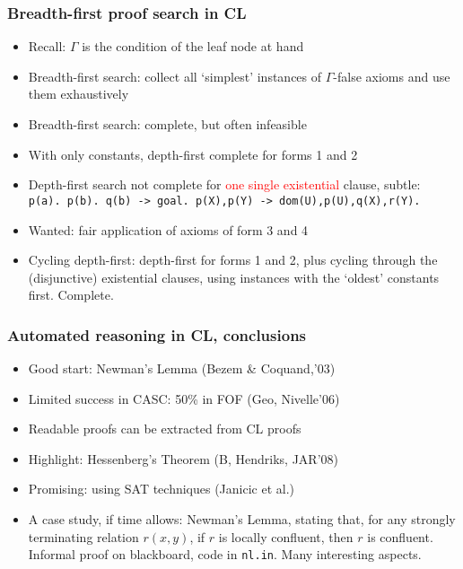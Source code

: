\documentclass[handout,11pt]{beamer}
\newcommand{\red}[1]{\textcolor{red}{#1}}
\begin{document}
\begin{frame}
\frametitle{Breadth-first proof search in CL}
 \begin{itemize}[<+->]   %
  \item Recall: $\Gamma$ is the condition of the leaf node at hand 
  \item Breadth-first search: collect all `simplest' instances  
  of $\Gamma$-false axioms and use them exhaustively
  \item Breadth-first search: complete, but often infeasible
  \item With only constants, depth-first complete for forms 1 and 2
  \item Depth-first search not complete for \red{one single existential} clause, subtle:
\texttt{  p(a). p(b). q(b) -> goal. p(X),p(Y) -> dom(U),p(U),q(X),r(Y).}
    \item Wanted: fair application of axioms of form 3 and 4 
    \item Cycling depth-first: depth-first for forms 1 and 2, plus cycling
    through the (disjunctive) existential clauses, using instances
    with the `oldest' constants first. Complete.
 \end{itemize}
\end{frame}



\begin{frame}
\frametitle{Automated reasoning in CL, conclusions}
 \begin{itemize}[<+->]
   \item Good start: Newman's Lemma (Bezem \& Coquand,'03)
   \item Limited success in CASC: 50\% in FOF (Geo, Nivelle'06)
   \item Readable proofs can be extracted from CL proofs
   \item Highlight: Hessenberg's Theorem (B, Hendriks, JAR'08)
   \item Promising: using SAT techniques (Janicic et al.)
   \item A case study, if time allows: Newman's Lemma, stating
   that, for any strongly terminating relation $r(x,y)$, if
   $r$ is locally confluent, then $r$ is confluent.
   Informal proof on blackboard, code in \texttt{nl.in}.
   Many interesting aspects.
 \end{itemize}
\end{frame}
\end{document}
